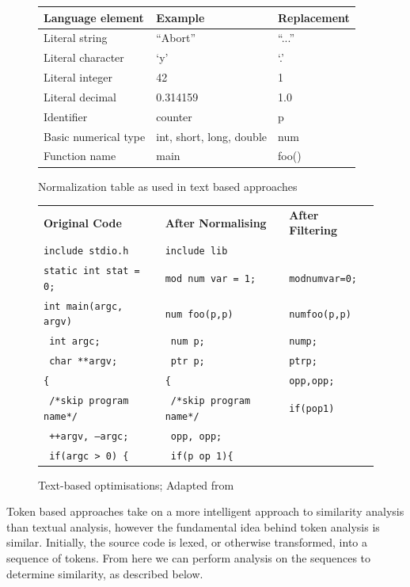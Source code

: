 \begin{figure}[h!]
\label{tab:normalise}
\begin{tabular}{| l | l | l |}
\hline 
\textbf{Language element} & \textbf{Example} & \textbf{Replacement} \\
\hline \hline
Literal string & ``Abort'' & ``...'' \\
\hline
Literal character & `y' & `.' \\
\hline
Literal integer & 42 & 1 \\
\hline
Literal decimal & 0.314159 & 1.0 \\
\hline
Identifier & counter & p \\
\hline
Basic numerical type & int, short, long, double & num \\
\hline
Function name & main & foo() \\
\hline \hline
\end{tabular}
\caption{Normalization table as used in text based approaches\cite{DucasseText}}
\end{figure}
\begin{figure}[h!]
\begin{tabular}{l l l}
\textbf{Original Code} & \textbf{After Normalising} & \textbf{After Filtering} \\
\texttt{include stdio.h} & \texttt{include lib} & \\
\texttt{static int stat = 0;} & \texttt{mod num var = 1;} & \texttt{modnumvar=0;}\\
\texttt{int main(argc, argv)} & \texttt{num foo(p,p)} & \texttt{numfoo(p,p)}\\
\texttt{  int argc;} & \texttt{  num p;} & \texttt{nump;}\\
\texttt{  char **argv;} & \texttt{  ptr p;} & \texttt{ptrp;}\\
\texttt{\{} & \texttt{\{} & \texttt{opp,opp;}\\
\texttt{  /*skip program name*/} & \texttt{  /*skip program name*/} & \texttt{if(pop1)}\\
\texttt{  ++argv, --argc;} & \texttt{  opp, opp;} & \\
\texttt{  if(argc > 0) \{} & \texttt{  if(p op 1)\{} & \\
\end{tabular}
\caption{Text-based optimisations; Adapted from\citep[p.~49]{CloneDetection}}
\label{code:optimisedText}
\end{figure}

Token based approaches take on a more intelligent approach to similarity analysis
than textual analysis, however the fundamental idea behind token analysis is similar.
Initially, the source code is lexed, or otherwise transformed, into a sequence of tokens.
From here we can perform analysis on the sequences to determine similarity, as described
below.

